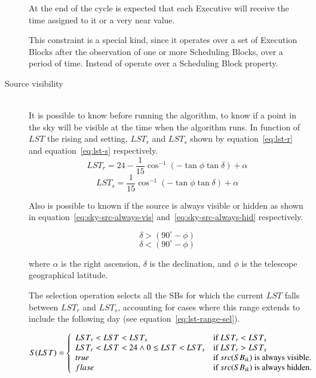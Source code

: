 \begin{description}
At the end of the cycle is expected that each Executive will receive the time assigned to it or a very near value. 

This constraint is a special kind, since it operates over a set of Execution Blocks after the observation of one or more Scheduling Blocks, over a period of time. Instead of operate over a Scheduling Block property.
 
\item[Source visibility] \hfill \\
It is possible to know before running the algorithm, to know if a point in the sky will be visible at the time when the algorithm runs.
In function of $LST$ the rising and setting, $LST_r$ and $LST_s$ shown by equation~\ref{eq:lst-r} and equation~\ref{eq:lst-s} respectively.
\begin{equation}
\label{eq:lst-r}
LST_r =  24 - \frac{1}{15} \cos^{-1} (-\tan\phi\tan\delta) + \alpha
\end{equation}
\begin{equation}
\label{eq:lst-s}
LST_s = \frac{1}{15} \cos^{-1} (-\tan\phi \tan\delta) + \alpha
\end{equation}

Also is possible to known if the source is always visible or hidden as shown in equation~\ref{eq:sky-src-always-vis} and~\ref{eq:sky-src-always-hid} respectively.

\begin{equation}
\label{eq:sky-src-always-vis}
\delta > (90^{\circ} - \phi)
\end{equation}
\begin{equation}
\label{eq:sky-src-always-hid}
\delta < (90^{\circ} - \phi)
\end{equation}

where $\alpha$ is the right ascension, $\delta$ is the declination, and
$\phi$ is the telescope geographical latitude.


The selection operation selects all the SBs for which the current $LST$ falls
between $LST_r$ and $LST_s$, accounting for cases where this range extends to include
the following day (see equation~\ref{eq:lst-range-sel}).

\begin{equation}
\label{eq:lst-range-sel}
S(LST) = \left\{ 
	\begin{array}{l l}
	LST_r < LST < LST_s & \mbox{if } LST_r < LST_s \\
	LST_r < LST < 24 \land 0 \leq LST < LST_s & \mbox{if } LST_r > LST_s  \\
	true & \mbox{if } src(SB_{ik}) \mbox{ is always visible.} \\
	flase & \mbox{if } src(SB_{ik}) \mbox{ is always hidden.} \\
	\end{array} \right .
\end{equation}


\end{description}
